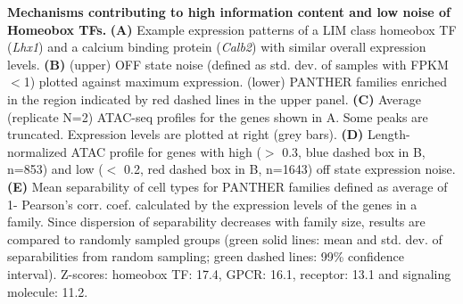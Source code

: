 \textbf{Mechanisms contributing to high information content and low noise of Homeobox TFs.}
\textbf{(A)} Example expression patterns of a LIM class homeobox TF (\textit{Lhx1}) and a calcium binding protein (\textit{Calb2}) with  similar overall expression levels. 
\textbf{(B)} (upper) OFF state noise (defined as std. dev. of samples with FPKM$<$1) plotted against maximum expression. (lower) PANTHER families enriched in the region indicated by red dashed lines in the upper panel.
\textbf{(C)} Average (replicate N=2) ATAC-seq profiles for the genes shown in A. Some peaks are truncated. Expression levels are plotted at right (grey bars).
\textbf{(D)} Length-normalized ATAC profile for genes with high ($>$ 0.3, blue dashed box in B, n=853) and low ($<$ 0.2, red dashed box in B, n=1643) off state expression noise.
\textbf{(E)} Mean separability of cell types for PANTHER families defined as average of 1- Pearson's corr. coef. calculated by the expression levels of the genes in a family. Since dispersion of separability decreases with family size, results are compared to randomly sampled groups (green solid lines: mean and std. dev. of separabilities from random sampling; green dashed lines: 99\% confidence interval). Z-scores: homeobox TF: 17.4, GPCR: 16.1, receptor: 13.1 and signaling molecule: 11.2. 
